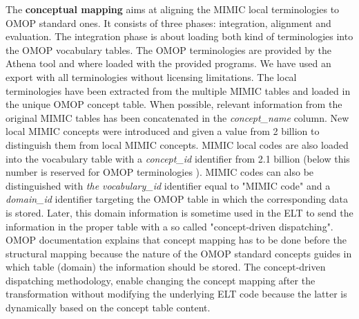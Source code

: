 The \textbf{conceptual mapping} aims at aligning the MIMIC local terminologies
to OMOP standard ones. It consists of three phases: integration, alignment and
evaluation.
The integration phase is about loading both kind of terminologies into the OMOP
vocabulary tables.
The OMOP terminologies are provided by the Athena tool \cite{ohdsi-athena} and
where loaded with the provided programs. We have used an export with all
terminologies without licensing limitations.
The local terminologies have been extracted from the multiple MIMIC tables and
loaded in the unique OMOP concept table. When possible, relevant information
from the original MIMIC tables has been concatenated in the
\textit{concept\_name} column. 
New local MIMIC concepts were introduced and given a value from 2 billion to
distinguish them from local MIMIC concepts.  MIMIC local codes are also loaded
into the vocabulary table with a \textit{concept\_id} identifier from 2.1
billion (below this number is reserved for OMOP terminologies
\cite{omop-documentation-pdf}). 
MIMIC codes can also be distinguished with \textit{the vocabulary\_id}
identifier equal to "MIMIC code" and a \textit{domain\_id} identifier targeting
the OMOP table in which the corresponding data is stored. Later, this domain
information is sometime used in the ELT to send the information in the proper
table with a so called "concept-driven dispatching". 
OMOP documentation explains that concept mapping has to be done before the
structural mapping because the nature of the OMOP standard concepts guides in
which table (domain) the information should be stored. The concept-driven
dispatching methodology, enable changing the concept mapping after the
transformation without modifying the underlying ELT code because the latter is
dynamically based on the concept table content.

